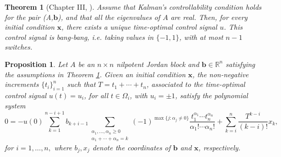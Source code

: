 \documentclass[10pt,a4paper]{amsart}
\newtheorem{theorem}{Theorem}
\newtheorem{proposition}{Proposition}
\newcommand{\R}{\mathbb{R}}
\begin{document}
\begin{theorem}[Chapter III, \cite{PMP}]\label{switching} Assume that Kalman's controllability condition holds for the pair (A,$\bm{b}$), and that all the eigenvalues of $A$ are real. Then, for every initial condition $\bm{x}$, there exists a unique time-optimal control signal $u$. This control signal is bang-bang, i.e. taking values in $\{-1,1\}$, with at most $n-1$ switches. 
\end{theorem}

\begin{proposition}\label{prop:21}
 Let $A$ be an $n\times n$ nilpotent Jordan block and $\bm{b}\in\R^n$ satisfying the assumptions in Theorem \ref{switching}. Given an initial condition $\bm{x}$, the non-negative increments $\{t_i\}_{i=1}^n$ such that $T=t_1+\cdots+t_n$, associated to the time-optimal control signal $u(t)=u_i$, for all $t \in \Omega_i$, with $u_i=\pm 1$, satisfy the polynomial system
 \begin{equation}\label{eq:polynomialSystem2}
 0=-u(0){\sum_{k=1}^{n-i+1} b_{k+i-1}}\sum_{\substack{\alpha_1,\ldots,\alpha_n\geq0\\
 \alpha_1+\cdots+\alpha_n=k}}(-1)^{\max \{j\colon \alpha_j\neq0\}}\frac{t_1^{\alpha_1}\cdots t_n^{\alpha_n}}{\alpha_1!\cdots\alpha_n!}+{\sum_{k=i}^{n}\frac{T^{k-i}}{(k-i)!}x_{k}},
 \end{equation}
 for $i=1,\dots,n,$ where $b_j, x_j$ denote the coordinates of $\bm b$ and $\bm x$, respectively.
 \end{proposition} 
\end{document}
